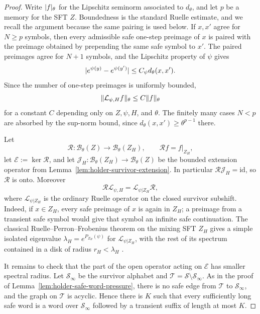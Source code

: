 \begin{proof}
Write \(\lvert f\rvert_\theta\) for the Lipschitz seminorm associated to
\(d_\theta\), and let \(p\) be a memory for the SFT \(Z\).  Boundedness is
the standard Ruelle estimate, and we recall the argument because the same
pairing is used below.  If \(x,x'\) agree for \(N\geq p\) symbols, then
every admissible safe one-step preimage of \(x\) is paired with the
preimage obtained by prepending the same safe symbol to \(x'\).  The
paired preimages agree for \(N+1\) symbols, and the Lipschitz property of
\(\psi\) gives
\[
  \lvert e^{\psi(y)}-e^{\psi(y')}\rvert\leq C_\psi d_\theta(x,x').
\]
Since the number of one-step preimages is uniformly bounded,
\[
  \lVert \mathcal L_{\psi,H}f\rVert_\theta
  \leq C\lVert f\rVert_\theta
\]
for a constant \(C\) depending only on \(Z,\psi,H\), and \(\theta\).  The
finitely many cases \(N<p\) are absorbed by the sup-norm bound, since
\(d_\theta(x,x')\geq\theta^{p-1}\) there.

Let
\[
  \mathcal R:\mathcal B_\theta(Z)\longrightarrow
  \mathcal B_\theta(Z_H),
  \qquad
  \mathcal R f=f|_{Z_H},
\]
let \(\mathcal E:=\ker\mathcal R\), and let
\(\mathcal J_H:\mathcal B_\theta(Z_H)\to\mathcal B_\theta(Z)\) be the
bounded extension operator from
Lemma~\ref{lem:holder-survivor-extension}.  In particular
\(\mathcal R\mathcal J_H=\mathrm{id}\), so \(\mathcal R\) is onto.  Moreover
\[
  \mathcal R\mathcal L_{\psi,H}
  =
  \mathcal L_{\psi|Z_H}\mathcal R,
\]
where \(\mathcal L_{\psi|Z_H}\) is the ordinary Ruelle operator on the
closed survivor subshift.  Indeed, if \(x\in Z_H\), every safe preimage
of \(x\) is again in \(Z_H\); a preimage from a transient safe symbol
would give that symbol an infinite safe continuation.  The classical
Ruelle--Perron--Frobenius theorem on the mixing SFT \(Z_H\) gives a
simple isolated eigenvalue
\(\lambda_H=e^{P_{Z_H}(\psi)}\) for
\(\mathcal L_{\psi|Z_H}\), with the rest of its spectrum contained in a
disk of radius \(r_H<\lambda_H\)
\citep{Bowen2008,Ruelle1978,Walters1975GMeasures}.

It remains to check that the part of the open operator acting on
\(\mathcal E\) has smaller spectral radius.  Let
\(\mathcal S_\infty\) be the survivor alphabet and
\(\mathcal T=\mathcal S\setminus\mathcal S_\infty\).  As in the proof of
Lemma~\ref{lem:holder-safe-word-pressure}, there is no safe edge from
\(\mathcal T\) to \(\mathcal S_\infty\), and the graph on
\(\mathcal T\) is acyclic.  Hence there is \(K\) such that every
sufficiently long safe word is a word over \(\mathcal S_\infty\) followed
by a transient suffix of length at most \(K\).


\end{proof}
